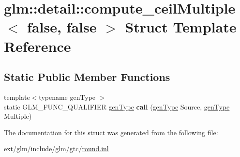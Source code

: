 \hypertarget{structglm_1_1detail_1_1compute__ceil_multiple_3_01false_00_01false_01_4}{\section{glm\-:\-:detail\-:\-:compute\-\_\-ceil\-Multiple$<$ false, false $>$ Struct Template Reference}
\label{structglm_1_1detail_1_1compute__ceil_multiple_3_01false_00_01false_01_4}
}
\subsection*{Static Public Member Functions}
\begin{DoxyCompactItemize}
\item 
\hypertarget{structglm_1_1detail_1_1compute__ceil_multiple_3_01false_00_01false_01_4_a42251f23ffbe25b624948a1128aa9957}{{\footnotesize template$<$typename gen\-Type $>$ }\\static G\-L\-M\-\_\-\-F\-U\-N\-C\-\_\-\-Q\-U\-A\-L\-I\-F\-I\-E\-R \hyperlink{structglm_1_1detail_1_1gen_type}{gen\-Type} {\bfseries call} (\hyperlink{structglm_1_1detail_1_1gen_type}{gen\-Type} Source, \hyperlink{structglm_1_1detail_1_1gen_type}{gen\-Type} Multiple)}\label{structglm_1_1detail_1_1compute__ceil_multiple_3_01false_00_01false_01_4_a42251f23ffbe25b624948a1128aa9957}

\end{DoxyCompactItemize}


The documentation for this struct was generated from the following file\-:\begin{DoxyCompactItemize}
\item 
ext/glm/include/glm/gtc/\hyperlink{round_8inl}{round.\-inl}\end{DoxyCompactItemize}
